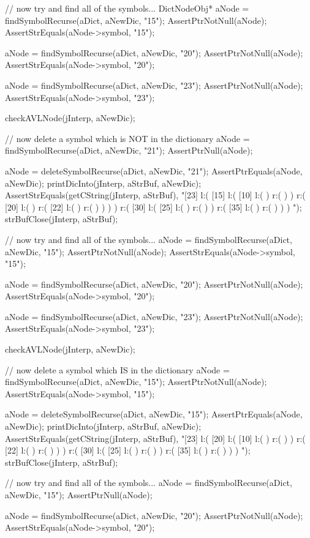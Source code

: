   // now try and find all of the symbols...
  DictNodeObj* aNode = findSymbolRecurse(aDict, aNewDic, "15");
  AssertPtrNotNull(aNode);
  AssertStrEquals(aNode->symbol, "15");

  aNode = findSymbolRecurse(aDict, aNewDic, "20");
  AssertPtrNotNull(aNode);
  AssertStrEquals(aNode->symbol, "20");

  aNode = findSymbolRecurse(aDict, aNewDic, "23");
  AssertPtrNotNull(aNode);
  AssertStrEquals(aNode->symbol, "23");

  checkAVLNode(jInterp, aNewDic);
  
  // now delete a symbol which is NOT in the dictionary
  aNode = findSymbolRecurse(aDict, aNewDic, "21");
  AssertPtrNull(aNode);
  
  aNode = deleteSymbolRecurse(aDict, aNewDic, "21");
  AssertPtrEquals(aNode, aNewDic);
  printDicInto(jInterp, aStrBuf, aNewDic);
  AssertStrEquals(getCString(jInterp, aStrBuf),
  "[23] l:( [15] l:( [10] l:(  ) r:(  )  ) r:( [20] l:(  ) r:( [22] l:(  ) r:(  )  )  )  ) r:( [30] l:( [25] l:(  ) r:(  )  ) r:( [35] l:(  ) r:(  )  )  ) ");
  strBufClose(jInterp, aStrBuf);

  // now try and find all of the symbols...
  aNode = findSymbolRecurse(aDict, aNewDic, "15");
  AssertPtrNotNull(aNode);
  AssertStrEquals(aNode->symbol, "15");

  aNode = findSymbolRecurse(aDict, aNewDic, "20");
  AssertPtrNotNull(aNode);
  AssertStrEquals(aNode->symbol, "20");

  aNode = findSymbolRecurse(aDict, aNewDic, "23");
  AssertPtrNotNull(aNode);
  AssertStrEquals(aNode->symbol, "23");

  checkAVLNode(jInterp, aNewDic);

  // now delete a symbol which IS in the dictionary
  aNode = findSymbolRecurse(aDict, aNewDic, "15");
  AssertPtrNotNull(aNode);
  AssertStrEquals(aNode->symbol, "15");
  
  aNode = deleteSymbolRecurse(aDict, aNewDic, "15");
  AssertPtrEquals(aNode, aNewDic);
  printDicInto(jInterp, aStrBuf, aNewDic);
  AssertStrEquals(getCString(jInterp, aStrBuf),
  "[23] l:( [20] l:( [10] l:(  ) r:(  )  ) r:( [22] l:(  ) r:(  )  )  ) r:( [30] l:( [25] l:(  ) r:(  )  ) r:( [35] l:(  ) r:(  )  )  ) ");
  strBufClose(jInterp, aStrBuf);

  // now try and find all of the symbols...
  aNode = findSymbolRecurse(aDict, aNewDic, "15");
  AssertPtrNull(aNode);

  aNode = findSymbolRecurse(aDict, aNewDic, "20");
  AssertPtrNotNull(aNode);
  AssertStrEquals(aNode->symbol, "20");

